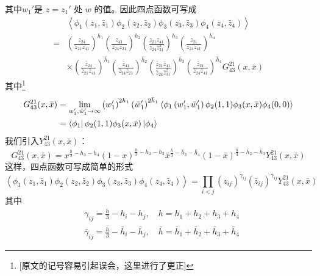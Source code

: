 其中$w_1' $是 $z=z_1'$ 处 $w$ 的值。因此四点函数可写成
\begin{equation}
	\begin{aligned} &\left\langle\phi_{1}\left(z_{1}, \bar{z}_{1}\right) \phi_{2}\left(z_{2}, \bar{z}_{2}\right) \phi_{3}\left(z_{3}, \bar{z}_{3}\right) \phi_{4}\left(z_{4}, \bar{z}_{4}\right)\right\rangle \\ =&\left(\frac{z_{24}}{z_{21} z_{41}}\right)^{h_{1}}\left(\frac{z_{41}}{z_{24} z_{21}}\right)^{h_{2}}\left(\frac{z_{21} z_{41}}{z_{24} z_{31}^{2}}\right)^{h_{3}}\left(\frac{z_{21}}{z_{24} z_{41}}\right)^{h_{4}} \\ &\times\left(\frac{\bar{z}_{24}}{\bar{z}_{21} \bar{z}_{41}}\right)^{\bar{h}_{1}}\left(\frac{\bar{z}_{41}}{\bar{z}_{24} \bar{z}_{21}}\right)^{\bar{h}_{2}}\left(\frac{\bar{z}_{21} \bar{z}_{41}}{\bar{z}_{24} \bar{z}_{31}^{2}}\right)^{\bar{h}_{3}}\left(\frac{\bar{z}_{21}}{\bar{z}_{24} \bar{z}_{41}}\right)^{\bar{h}_{4}} G^{21}_{43}(x, \bar{x}) \end{aligned}
\end{equation}
其中\footnote{[原文的记号容易引起误会，这里进行了更正]}
\begin{equation}
	\begin{aligned} G_{43}^{21}(x, \bar{x}) &=\lim _{w_{1}', \bar{w}_{1}' \rightarrow \infty}\left(w_{1}^{\prime}\right)^{2 h_{1}}\left(\bar{w}_{1}^{\prime}\right)^{2 \bar{h}_{1}}\left\langle\phi_{1}\left(w_{1}^{\prime}, \bar{w}_{1}^{\prime}\right) \phi_{2}(1,1) \phi_{3}(x, \bar{x}) \phi_{4}(0,0)\right\rangle \\ &=\bra{\phi_1} \phi_{2}(1,1) \phi_{3}(x, \bar{x})\ket{\phi_4} \end{aligned}
\end{equation}
我们引入$ Y_{43}^{21}(x, \bar{x}) $：
\begin{equation}
	G_{43}^{21}(x, \bar{x})=x^{\frac{h}{3}-h_{3}-h_{4}}(1-x)^{\frac{h}{3}-h_{2}-h_{3}} \bar{x}^{\frac{\bar{h}}{3}-\bar{h}_{3}-\bar{h}_{4}}(1-\bar{x})^{\frac{\bar{h}}{3}-\bar{h}_{2}-\bar{h}_{3}} Y_{43}^{21}(x, \bar{x})
\end{equation}
这样，四点函数可写成简单的形式
\begin{equation}
	\left\langle\phi_{1}\left(z_{1}, \bar{z}_{1}\right) \phi_{2}\left(z_{2}, \bar{z}_{2}\right) \phi_{3}\left(z_{3}, \bar{z}_{3}\right) \phi_{4}\left(z_{4}, \bar{z}_{4}\right)\right\rangle=\prod_{i<j}\left(z_{i j}\right)^{\gamma_{i j}}\left(\bar{z}_{i j}\right)^{\bar{\gamma}_{i j}} Y_{43}^{21}(x, \bar{x})
\end{equation}
其中
\begin{equation}
	\begin{aligned} &\gamma_{i j}=\frac{h}{3}-h_{i}-h_{j}, \quad h=h_{1}+h_{2}+h_{3}+h_{4}\\ &\bar{\gamma}_{i j}=\frac{\bar{h}}{3}-\bar{h}_{i}-\bar{h}_{j}, \quad \bar{h}=\bar{h}_{1}+\bar{h}_{2}+\bar{h}_{3}+\bar{h}_{4} \end{aligned}
\end{equation}

